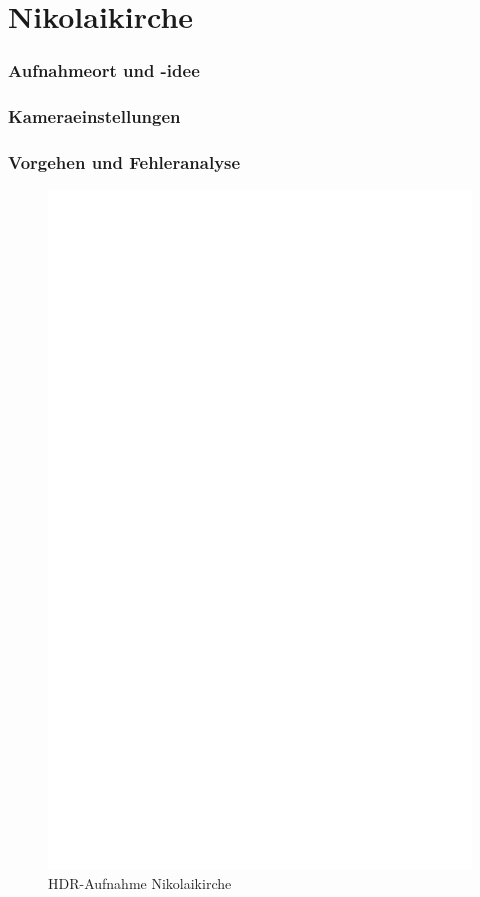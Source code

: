 \documentclass[liststotoc,bibtotoc,fontsize=14pt,]{scrreprt}
\begin{document}
	
	\section{Nikolaikirche}
	\label{sec:nikolai}
		\subsubsection{Aufnahmeort und -idee}

		
		\subsubsection{Kameraeinstellungen}
			
		\subsubsection{Vorgehen und Fehleranalyse}
		
			 \newpage
			 \begin{figure}[h]
			 	\includegraphics[width=\linewidth]{img/ph.jpg}
			 	\caption{HDR-Aufnahme Nikolaikirche}
			 \end{figure}
\end{document}
